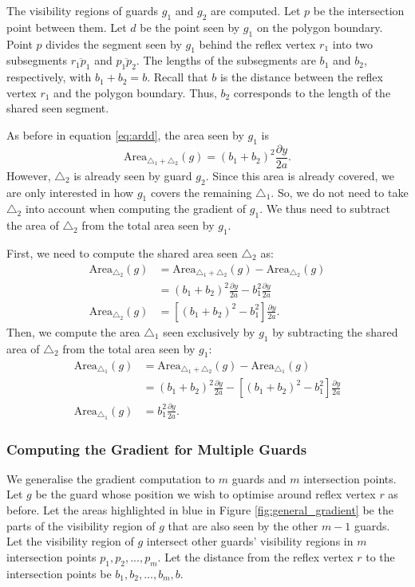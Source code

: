 The visibility regions of guards $g_1$ and $g_2$ are computed. Let $p$ be the intersection point between them. Let $d$ be the point seen by $g_1$ on the polygon boundary. Point $p$ divides the segment seen by $g_1$ behind the reflex vertex $r_1$ into two subsegments $\overline{r_1p_1}$ and $\overline{p_1p_2}$. The lengths of the subsegments are $b_1$ and $b_2$, respectively, with $b_1 + b_2 = b$. Recall that $b$ is the distance between the reflex vertex $r_1$ and the polygon boundary. Thus,  $b_2$ corresponds to the length of the shared seen segment.

As before in equation \ref{eq:ardd}, the area seen by $g_1$ is $$\text{Area}_{\triangle_1 + \triangle_2}(g) = (b_1 + b_2)^2\frac{\partial y}{2a}.$$
However, $\triangle_2$ is already seen by guard $g_2$. Since this area is already covered, we are only interested in how $g_1$ covers the remaining $\triangle_1$. So, we do not need to take $\triangle_2$ into account when computing the gradient of $g_1$. We thus need to subtract the area of $\triangle_2$ from the total area seen by $g_1$. 

First, we need to compute the shared area seen $\triangle_2$ as:
\begin{align}
    \text{Area}_{\triangle_2}(g) &= \text{Area}_{\triangle_1 + \triangle_2}(g) - \text{Area}_{\triangle_2}(g) \nonumber \\
                              &= (b_1 + b_2)^2\frac{\partial y}{2a} - b_1^2\frac{\partial y}{2a} \nonumber \\
    \text{Area}_{\triangle_2}(g)&= \left[(b_1 + b_2)^2 - b_1^2\right]\frac{\partial y}{2a}. \label{eq:multiple_areas} 
\end{align}
Then, we  compute the area $\triangle_1$ seen exclusively by $g_1$ by subtracting the shared area of $\triangle_2$ from the total area seen by $g_1$: 
\begin{align*}
    \text{Area}_{\triangle_1}(g) &= \text{Area}_{\triangle_1 + \triangle_2}(g) - \text{Area}_{\triangle_1}(g) \\
                              &= (b_1 + b_2)^2\frac{\partial y}{2a} - \left[(b_1 + b_2)^2 - b_1^2\right]\frac{\partial y}{2a} \\
    \text{Area}_{\triangle_1}(g) &= b_1^2\frac{\partial y}{2a}. 
\end{align*}

\subsubsection{Computing the Gradient for Multiple Guards}
We generalise the gradient computation to $m$ guards and $m$ intersection points. Let $g$ be the guard whose position we wish to optimise around reflex vertex $r$ as before. Let the areas highlighted in blue in Figure \ref{fig:general_gradient} be the parts of the visibility region of $g$ that are also seen by the other $m - 1$ guards. Let the visibility region of $g$ intersect other guards' visibility regions in $m$ intersection points $p_1, p_2, ..., p_m$. Let the distance from the reflex vertex $r$ to the intersection points be $b_{1}, b_{2}, ..., b_{m}, b$.

